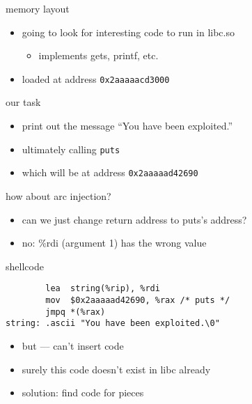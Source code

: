 \begin{frame}[fragile,label=memoryLayout]{memory layout}
\begin{itemize}
    \item going to look for interesting code to run in libc.so
        \begin{itemize}
        \item implements gets, printf, etc.
        \end{itemize}
    \item loaded at address {\tt 0x2aaaaacd3000}
\end{itemize}
\end{frame}

\begin{frame}{our task}
    \begin{itemize}
    \item print out the message ``You have been exploited.''
    \item ultimately calling {\tt puts}
    \item which will be at address {\tt 0x2aaaaad42690}
    \end{itemize}
\end{frame}

\begin{frame}{how about arc injection?}
    \begin{itemize}
    \item can we just change return address to puts's address?
    \vspace{.5cm}
    \item no: \%rdi (argument 1) has the wrong value
    \end{itemize}
\end{frame}



\begin{frame}[fragile,label=shellcode]{shellcode}
\begin{lstlisting}
        lea  string(%rip), %rdi
        mov  $0x2aaaaad42690, %rax /* puts */
        jmpq *(%rax)
string: .ascii "You have been exploited.\0"
\end{lstlisting}
    \begin{itemize}
        \item but --- can't insert code
        \item surely this code doesn't exist in libc already
        \item solution: find code for pieces
    \end{itemize}
\end{frame}

